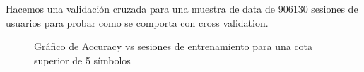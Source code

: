 	Hacemos una validación cruzada para una muestra de data de 906130 sesiones de usuarios para probar como se comporta con cross validation.
	
	
	
	\begin{figure}[h] 
		\centering
		\caption{Gráfico de Accuracy vs sesiones de entrenamiento para una cota superior de 5 símbolos}
		\label{fig:sim}
	\end{figure}